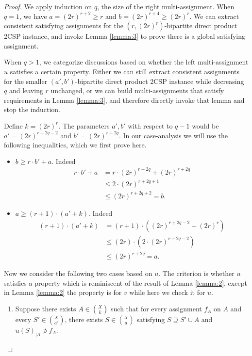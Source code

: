 \begin{proof}
We apply induction on $q$, the size of the right multi-assignment. When $q=1$, we have $a=(2r)^{r+2}\ge r$ and $b=(2r)^{r+4} \ge (2r)^r$. We can extract consistent satisfying assignments for the $(r,(2r)^r)$-bipartite direct product 2CSP instance, and invoke Lemma \ref{lemma:3} to prove there is a global satisfying assignment.

When $q>1$, we categorize discussions based on whether the left multi-assignment $u$ satisfies a certain property. Either we can still extract consistent assignments for the smaller $(a',b')$-bipartite direct product 2CSP instance while decreasing $q$ and leaving $r$ unchanged, or we can build multi-assignments that satisfy requirements in Lemma \ref{lemma:3}, and therefore directly invoke that lemma and stop the induction.

Define $k=(2r)^r$. The parameters $a',b'$ with respect to $q-1$ would be $a'=(2r)^{r+2q-2}$ and $b'=(2r)^{r+2q}$. In our case-analysis we will use the following inequalities, which we first prove here.

\begin{itemize}
    \item $b \ge r\cdot b'+a$.  Indeed 
    \[
    \begin{aligned}
        r\cdot b'+a & = r\cdot (2r)^{r+2q}+(2r)^{r+2q} \\
        & \le 2\cdot (2r)^{r+2q+1} \\
        & \le (2r)^{r+2q+2} =b.
    \end{aligned}
    \]
    \item $a \ge (r+1)\cdot (a'+k)$. Indeed
    \[
    \begin{aligned}
        (r+1)\cdot (a'+k) & = (r+1)\cdot ((2r)^{r+2q-2}+(2r)^r) \\
        & \le (2r)\cdot (2 \cdot (2r)^{r+2q-2}) \\
        & \le (2r)^{r+2q} = a.
    \end{aligned}
    \]
\end{itemize}

Now we consider the following two cases based on $u$. The criterion is whether $u$ satisfies a property which is reminiscent of the result of Lemma \ref{lemma:2}, except in Lemma \ref{lemma:2} the property is for $v$ while here we check it for $u$.

\begin{enumerate}
    \item Suppose there exists $A \in \binom{X}{k}$ such that for every assignment $f_A$ on $A$ and every $S' \in \binom{X}{a'}$, there exists $S \in \binom{X}{a}$ satisfying $S \supseteq S' \cup A$ and $u(S)_{|A} \not\ni f_A$.


\end{enumerate}
\end{proof}
